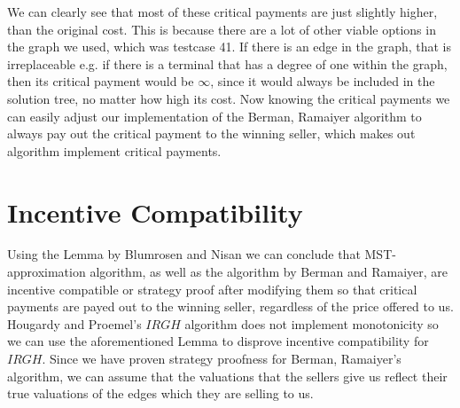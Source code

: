 We can clearly see that most of these critical payments are just slightly higher, than the original cost. This is because there are a lot of other viable options in the graph we used, which was testcase 41. If there is an edge in the graph, that is irreplaceable e.g. if there is a terminal that has a degree of one within the graph, then its critical payment would be $\infty$, since it would always be included in the solution tree, no matter how high its cost. Now knowing the critical payments we can easily adjust our implementation of the Berman, Ramaiyer algorithm to always pay out the critical payment to the winning seller, which makes out algorithm implement critical payments. 


\section{Incentive Compatibility}

Using the Lemma by Blumrosen and Nisan \cite{BlNi07} we can conclude that MST-approximation algorithm, as well as the algorithm by Berman and Ramaiyer, are incentive compatible or strategy proof after modifying them so that critical payments are payed out to the winning seller, regardless of the price offered to us. Hougardy and Proemel's $IRGH$ algorithm does not implement monotonicity so we can use the aforementioned Lemma to disprove incentive compatibility for $IRGH$. Since we have proven strategy proofness for Berman, Ramaiyer's algorithm, we can assume that the valuations that the sellers give us reflect their true valuations of the edges which they are selling to us. 
